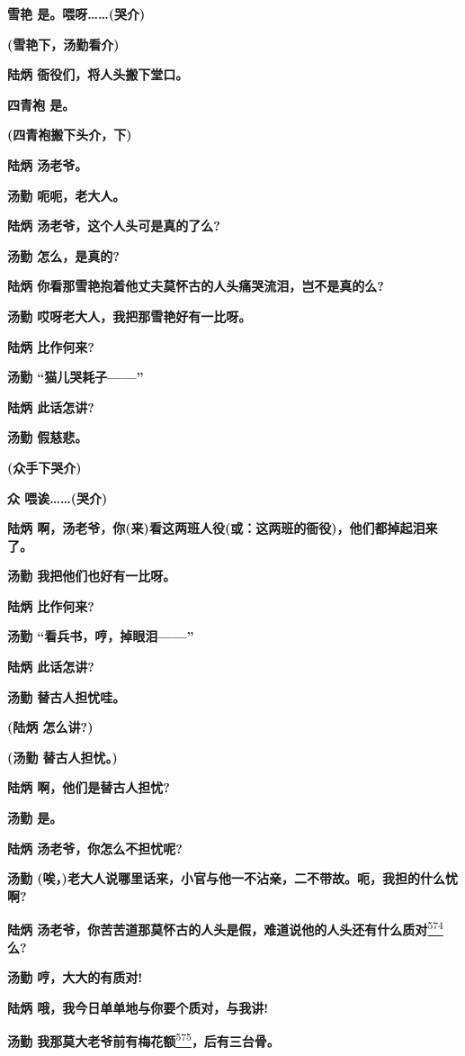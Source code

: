 \textbf{雪艳 是。喂呀\ldots{}\ldots{}(哭介)}

\textbf{(雪艳下，汤勤看介)}

\textbf{陆炳 衙役们，将人头搬下堂口。}

\textbf{四青袍 是。}

\textbf{(四青袍搬下头介，下)}

\textbf{陆炳 汤老爷。}

\textbf{汤勤 呃呃，老大人。}

\textbf{陆炳 汤老爷，这个人头可是真的了么?}

\textbf{汤勤 怎么，是真的?}

\textbf{陆炳 你看那雪艳抱着他丈夫莫怀古的人头痛哭流泪，岂不是真的么?}

\textbf{汤勤 哎呀老大人，我把那雪艳好有一比呀。}

\textbf{陆炳 比作何来?}

\textbf{汤勤 ``猫儿哭耗子------''}

\textbf{陆炳 此话怎讲?}

\textbf{汤勤 假慈悲。}

\textbf{(众手下哭介)}

\textbf{众 喂诶\ldots{}\ldots{}(哭介)}

\textbf{陆炳
啊，汤老爷，你(来)看这两班人役(或：这两班的衙役)，他们都掉起泪来了。}

\textbf{汤勤 我把他们也好有一比呀。}

\textbf{陆炳 比作何来?}

\textbf{汤勤 ``看兵书，哼，掉眼泪------''}

\textbf{陆炳 此话怎讲?}

\textbf{汤勤 替古人担忧哇。}

\textbf{(陆炳 怎么讲?)}

\textbf{(汤勤 替古人担忧。)}

\textbf{陆炳 啊，他们是替古人担忧?}

\textbf{汤勤 是。}

\textbf{陆炳 汤老爷，你怎么不担忧呢?}

\textbf{汤勤
(唉，)老大人说哪里话来，小官与他一不沾亲，二不带故。呃，我担的什么忧啊?}

\textbf{陆炳
汤老爷，你苦苦道那莫怀古的人头是假，难道说他的人头还有什么质对}\protect\hyperlink{fn574}{\textsuperscript{574}}\textbf{么?}

\textbf{汤勤 哼，大大的有质对!}

\textbf{陆炳 哦，我今日单单地与你要个质对，与我讲!}

\textbf{汤勤
我那莫大老爷前有梅花额}\protect\hyperlink{fn575}{\textsuperscript{575}}\textbf{，后有三台骨。}

